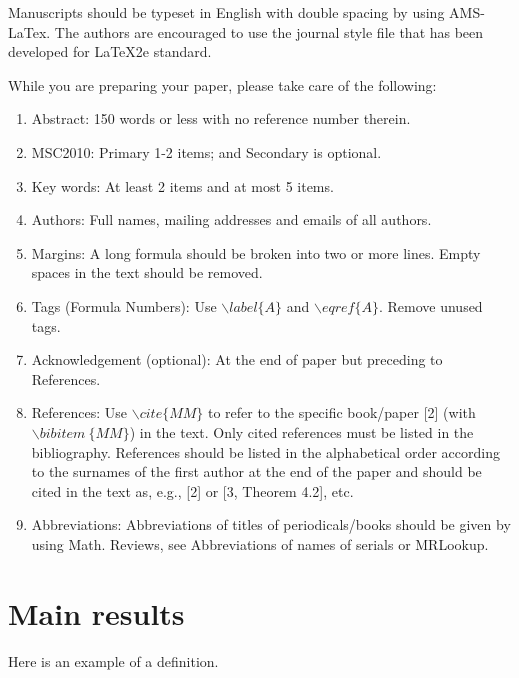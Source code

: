 \documentclass[12pt, reqno]{amsart}
\theoremstyle{definition}
\theoremstyle{remark}
\numberwithin{equation}{section}
\begin{document}
Manuscripts should be typeset in English with double spacing by
using AMS-LaTex. The authors are encouraged to use the journal style
file that has been developed for LaTeX2e standard.

While you are preparing your paper, please take care of the
following:
\begin{enumerate}
\item Abstract: 150 words or less with no reference number therein.\\
\item MSC2010: Primary 1-2 items; and Secondary is optional.\\

\item Key words: At least 2 items and at most 5 items.\\
\item Authors: Full names, mailing addresses and emails of all authors.\\
\item Margins: A long formula should be broken into two or more lines. Empty spaces in the text should be removed.\\
\item Tags (Formula Numbers): Use $\backslash label\{A\}$ and $\backslash eqref\{A\}$. Remove unused tags. \\
\item Acknowledgement (optional): At the end of paper but preceding to References.\\
\item References: Use $\backslash cite\{MM\}$ to refer to the specific book/paper [2] (with $\backslash bibitem~\{MM\}$) in the text. Only cited references must be listed in the bibliography. References should be listed in the alphabetical order according to the surnames of the first author at the end of the paper and should be cited in the text as, e.g., [2] or [3, Theorem 4.2], etc.\\
\item Abbreviations: Abbreviations of titles of periodicals/books should be given by using Math. Reviews, see Abbreviations of names of serials or MRLookup.

\end{enumerate}

\section{Main results}

Here is an example of a definition. 
\end{document}
